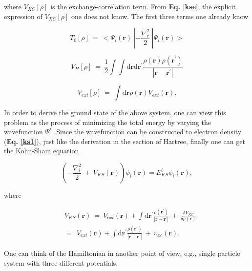 \documentclass[a4paper, 12pt, titlepage,oneside,drop]{kthesis}
\begin{document}
where $V_\textit{XC}[\rho]$  is the exchange-correlation term. From \textbf{Eq. \ref{kse}}, the explicit expression of $V_\textit{XC}[\rho]$ one does not know. 
The first three terms one already know

\begin{equation}
 T_{0}[\rho]\ = \ < \Psi_{i}(\textbf{r}) \ | -\frac{\nabla^{2}_{r}}{2} \ | \Psi_{i}(\textbf{r}) >
\end{equation}

\begin{equation}
V_\textit{H}[\rho] \ = \ \frac{1}{2} \int \int \mathrm{d} {\textbf{r}} \mathrm{d}{\textbf{r}^{\prime}} \frac{\rho({\textbf{r}})\rho(\textbf{r}^{\prime})}{|{\textbf{r}}-{\textbf{r}}^{\prime}|}
\end{equation}

\begin{equation}
V_\textit{ext}[\rho]\ = \ \int \mathrm{d}{\textbf{r}} \rho(\textbf{r}) V_\textit{ext}(\textbf{r}). 
\end{equation}

In order to derive the ground state of the above system, one can view this problem as the process of minimizing the total energy by varying the wavefunction $\Psi^*$. Since
 the wavefunction can be constructed to electron density (\textbf{Eq. \ref{ks1}}), just like the derivation in the section of Hartree, finally one can get the Kohn-Sham equation

\begin{equation}\label{aaa}
 (-\frac{\nabla^{2}_{i}}{2}\ + \ V_\textit{KS}(\textbf{r})) \phi_{\textit{i}}(\textbf{r}) = E_{\textit{KS}}^{\textit{i}} \phi_{\textit{i}}(\textbf{r}),
\end{equation}

where

\begin{equation}\begin{split}
&\ V_\textit{KS}(\textbf{r}) \ = \ V_\textit{ext}(\textbf{r}) + \int \mathrm{d}{\textbf{r}^{\prime}}  \frac{\rho(\textbf{r}^{\prime})}{|{\textbf{r}}-{\textbf{r}}^{\prime}|} \ + \ \frac{\delta{V_\textit{XC}}}{\delta{\rho(\textbf{r})}} \\
&\ = \ \ V_\textit{ext}(\textbf{r}) + \int \mathrm{d}{\textbf{r}^{\prime}}  \frac{\rho(\textbf{r}^{\prime})}{|{\textbf{r}}-{\textbf{r}}^{\prime}|} \ + \ \upsilon_\textit{xc}(\textbf{r}).
\end{split}
\end{equation}

One can think of the Hamiltonian in another point of view, e.g., single particle system with three different potentials. 
\end{document}
